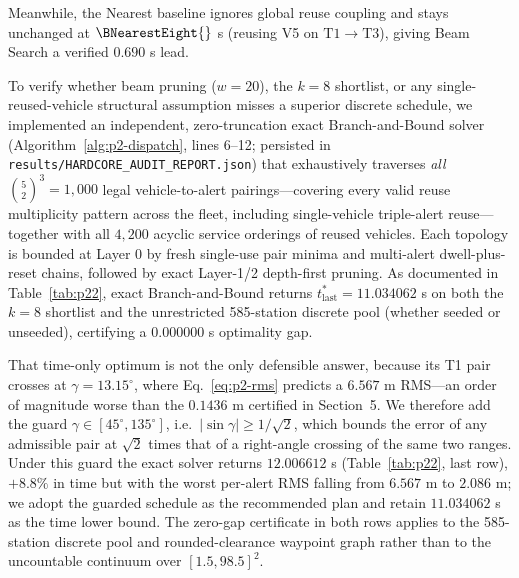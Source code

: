 Meanwhile, the Nearest baseline ignores global reuse coupling and stays unchanged at $\BNearestEight{}$ s (reusing V5 on $\mathrm{T1}\!\to\!\mathrm{T3}$), giving Beam Search a verified $0.690$ s lead.

To verify whether beam pruning ($w=20$), the $k=8$ shortlist, or any single-reused-vehicle structural assumption misses a superior discrete schedule, we implemented an independent, zero-truncation exact Branch-and-Bound solver (Algorithm~\ref{alg:p2-dispatch}, lines 6--12; persisted in \texttt{results/\allowbreak HARDCORE\_\allowbreak AUDIT\_\allowbreak REPORT.json}) that exhaustively traverses \emph{all} $\binom{5}{2}^3 = 1{,}000$ legal vehicle-to-alert pairings—covering every valid reuse multiplicity pattern across the fleet, including single-vehicle triple-alert reuse—together with all $4{,}200$ acyclic service orderings of reused vehicles. Each topology is bounded at Layer 0 by fresh single-use pair minima and multi-alert dwell-plus-reset chains, followed by exact Layer-1/2 depth-first pruning. As documented in Table~\ref{tab:p22}, exact Branch-and-Bound returns $t_{\mathrm{last}}^*=11.034062$ s on both the $k=8$ shortlist and the unrestricted 585-station discrete pool (whether seeded or unseeded), certifying a $0.000000$ s optimality gap.

That time-only optimum is not the only defensible answer, because its T1 pair crosses at $\gamma=13.15^\circ$, where Eq.~\eqref{eq:p2-rms} predicts a $6.567$ m RMS---an order of magnitude worse than the $0.1436$ m certified in Section~5. We therefore add the guard $\gamma\in[45^\circ,135^\circ]$, i.e.\ $|\sin\gamma|\ge 1/\sqrt{2}$, which bounds the error of any admissible pair at $\sqrt{2}$ times that of a right-angle crossing of the same two ranges. Under this guard the exact solver returns $12.006612$ s (Table~\ref{tab:p22}, last row), $+8.8\%$ in time but with the worst per-alert RMS falling from $6.567$ m to $2.086$ m; we adopt the guarded schedule as the recommended plan and retain $11.034062$ s as the time lower bound. The zero-gap certificate in both rows applies to the 585-station discrete pool and rounded-clearance waypoint graph rather than to the uncountable continuum over $[1.5,98.5]^2$.
